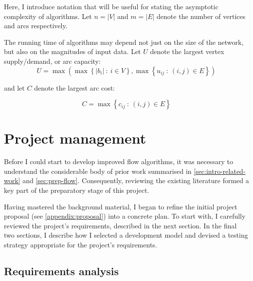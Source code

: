 
Here, I introduce notation that will be useful for stating the asymptotic complexity of algorithms. Let $n=|V|$ and $m=|E|$ denote the number of vertices and arcs respectively.

The running time of algorithms may depend not just on the size of the network, but also on the magnitudes of input data. Let $U$ denote the largest vertex supply/demand, or arc capacity:
\begin{equation}
U=\max\left(\max\left\{ |b_{i}|\::\: i\in V\right\} ,\max\left\{ u_{ij}\::\:\left(i,j\right)\in E\right\} \right)
\end{equation}

and let $C$ denote the largest arc cost:

\begin{equation}
C=\max\left\{ c_{ij}\::\:(i,j)\in E\right\} 
\end{equation}

\section{Project management}

Before I could start to develop improved flow algorithms, it was necessary to understand the considerable body of prior work  summarised in \cref{sec:intro-related-work} and \cref{sec:prep-flow}. Consequently, reviewing the existing literature formed a key part of the preparatory stage of this project. 

Having mastered the background material, I began to refine the initial project proposal (see \cref{appendix:proposal}) into a concrete plan. To start with, I carefully reviewed the project's requirements, described in the next section. In the final two sections, I describe how I selected a development model and devised a testing strategy appropriate for the project's requirements.

\subsection{Requirements analysis} \label{sec:prep-management-requirements}


